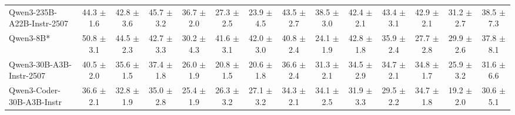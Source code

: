 \documentclass{llmxive}
\begin{document}
\begin{table}[hbt]
{\begin{tabular}{l *{13}{c}}
Qwen3-235B-A22B-Instr-2507 &
44.3 {\tiny$\pm$ 1.6} &
42.8 {\tiny$\pm$ 3.6} &
45.7 {\tiny$\pm$ 3.2} &
36.7 {\tiny$\pm$ 2.0} &
27.3 {\tiny$\pm$ 2.5} &
23.9 {\tiny$\pm$ 4.5} &
43.5 {\tiny$\pm$ 2.7} &
38.5 {\tiny$\pm$ 3.0} &
42.4 {\tiny$\pm$ 2.1} &
43.4 {\tiny$\pm$ 3.1} &
42.9 {\tiny$\pm$ 2.1} &
31.2 {\tiny$\pm$ 2.7} &
38.5 {\tiny$\pm$ 7.3} \\

\rowcolor{gray!10}
Qwen3-8B* &
50.8 {\tiny$\pm$ 3.1} &
44.5 {\tiny$\pm$ 2.3} &
42.7 {\tiny$\pm$ 3.3} &
30.2 {\tiny$\pm$ 4.3} &
41.6 {\tiny$\pm$ 3.1} &
42.0 {\tiny$\pm$ 3.0} &
40.8 {\tiny$\pm$ 2.4} &
24.1 {\tiny$\pm$ 1.9} &
42.8 {\tiny$\pm$ 1.8} &
35.9 {\tiny$\pm$ 2.4} &
27.7 {\tiny$\pm$ 2.8} &
29.9 {\tiny$\pm$ 2.6} &
37.8 {\tiny$\pm$ 8.1} \\

Qwen3-30B-A3B-Instr-2507 &
40.5 {\tiny$\pm$ 2.0} &
35.6 {\tiny$\pm$ 1.5} &
37.4 {\tiny$\pm$ 1.8} &
26.0 {\tiny$\pm$ 1.9} &
20.8 {\tiny$\pm$ 1.5} &
20.6 {\tiny$\pm$ 1.8} &
36.6 {\tiny$\pm$ 2.4} &
31.3 {\tiny$\pm$ 2.1} &
34.5 {\tiny$\pm$ 2.9} &
34.7 {\tiny$\pm$ 2.1} &
34.8 {\tiny$\pm$ 1.7} &
25.9 {\tiny$\pm$ 3.2} &
31.6 {\tiny$\pm$ 6.6} \\



\rowcolor{gray!10}
Qwen3-Coder-30B-A3B-Instr &
36.6 {\tiny$\pm$ 2.1} &
32.8 {\tiny$\pm$ 1.9} &
35.0 {\tiny$\pm$ 2.8} &
25.4 {\tiny$\pm$ 1.9} &
26.3 {\tiny$\pm$ 3.2} &
27.1 {\tiny$\pm$ 3.2} &
34.3 {\tiny$\pm$ 2.1} &
34.1 {\tiny$\pm$ 2.5} &
31.9 {\tiny$\pm$ 3.3} &
29.5 {\tiny$\pm$ 2.2} &
34.7 {\tiny$\pm$ 1.8} &
19.2 {\tiny$\pm$ 2.0} &
30.6 {\tiny$\pm$ 5.1} \\



\end{tabular}}
\end{table}
\end{document}
